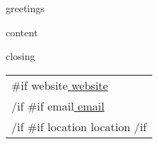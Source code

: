 \documentclass{article}
\begin{document}
\color{primary-950}

\textbf {
  \huge
  \newline
  \newline
}
\vspace{1.0cm}

{{ greetings }}
\vspace{0.5cm}

{{ content }}
\vspace{0.75cm}

\begin{flushright}
{{ closing }}

\vspace{0.25cm}

{
  \setlength{\tabcolsep}{0pt}
  \begin{supertabular}{l}
    {{#if website}}\href{ {{ website }} }{ {{ website }} } \\ {{/if}}\ignorespaces
    {{#if email}}\href{ mailto:{{ email }} }{ {{ email }} } \\ {{/if}}\ignorespaces
    {{#if location}} {{ location }} {{/if}}\ignorespaces
  \end{supertabular}
}
\end{flushright}
\end{document}
